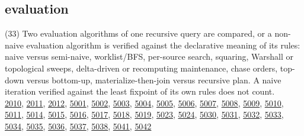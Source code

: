 \documentclass[10pt]{article}
\begin{document}
\subsection*{evaluation}
\begin{description}[leftmargin=1.2em,itemsep=2pt]
\item[\texttt{evaluation-strategies}\label{tag:evaluation-strategies}] (33) Two evaluation algorithms of one recursive query are compared, or a non-naive evaluation algorithm is verified against the declarative meaning of its rules: naive versus semi-naive, worklist/BFS, per-source search, squaring, Warshall or topological sweeps, delta-driven or recomputing maintenance, chase orders, top-down versus bottom-up, materialize-then-join versus recursive plan. A naive iteration verified against the least fixpoint of its own rules does not count.\\ {\small \hyperref[case:Example2010]{2010}, \hyperref[case:Example2011]{2011}, \hyperref[case:Example2012]{2012}, \hyperref[case:Example5001]{5001}, \hyperref[case:Example5002]{5002}, \hyperref[case:Example5003]{5003}, \hyperref[case:Example5004]{5004}, \hyperref[case:Example5005]{5005}, \hyperref[case:Example5006]{5006}, \hyperref[case:Example5007]{5007}, \hyperref[case:Example5008]{5008}, \hyperref[case:Example5009]{5009}, \hyperref[case:Example5010]{5010}, \hyperref[case:Example5011]{5011}, \hyperref[case:Example5014]{5014}, \hyperref[case:Example5015]{5015}, \hyperref[case:Example5016]{5016}, \hyperref[case:Example5017]{5017}, \hyperref[case:Example5018]{5018}, \hyperref[case:Example5019]{5019}, \hyperref[case:Example5023]{5023}, \hyperref[case:Example5024]{5024}, \hyperref[case:Example5030]{5030}, \hyperref[case:Example5031]{5031}, \hyperref[case:Example5032]{5032}, \hyperref[case:Example5033]{5033}, \hyperref[case:Example5034]{5034}, \hyperref[case:Example5035]{5035}, \hyperref[case:Example5036]{5036}, \hyperref[case:Example5037]{5037}, \hyperref[case:Example5038]{5038}, \hyperref[case:Example5041]{5041}, \hyperref[case:Example5042]{5042}}

\end{description}
\end{document}
